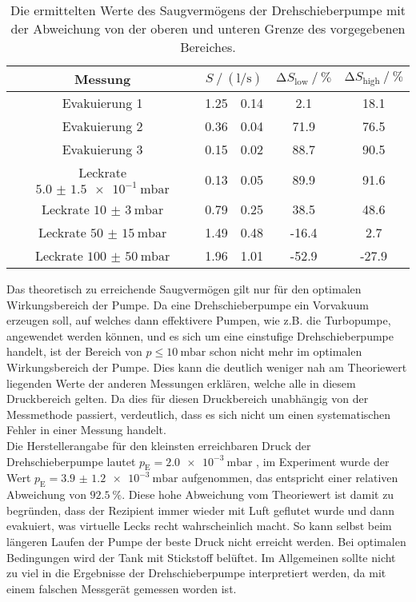 \begin{table}
    \centering
    \caption{Die ermittelten Werte des Saugvermögens der Drehschieberpumpe mit der Abweichung von der oberen und unteren Grenze des vorgegebenen Bereiches.}
    \label{tab:compare_dreh}
    \begin{tabular}{c  S @{${}\pm{}$} S  S[table-format=2.1] S[table-format=3.1]}
        \toprule
        {Messung} &  & {$\increment S_\text{low} \mathbin{/} \si{\percent}$} & {$\increment S_\text{high} \mathbin{/} \si{\percent}$} \\ 
        \midrule
        Evakuierung 1                       & 1.25 & 0.14 &  2.1 &  18.1\\
        Evakuierung 2                       & 0.36 & 0.04 & 71.9 &  76.5\\
        Evakuierung 3                       & 0.15 & 0.02 & 88.7 &  90.5\\
        Leckrate $\SI{5.0(15)e-1}{\milli\bar}$ & 0.13 & 0.05 & 89.9 &  91.6\\
        Leckrate $\SI{10(3)}{\milli\bar}$   & 0.79 & 0.25 & 38.5 &  48.6\\
        Leckrate $\SI{50(15)}{\milli\bar}$  & 1.49 & 0.48 &-16.4 &   2.7\\
        Leckrate $\SI{100(50)}{\milli\bar}$ & 1.96 & 1.01 &-52.9 & -27.9\\
        \bottomrule
    \end{tabular}
\end{table}

\noindent Das theoretisch zu erreichende Saugvermögen gilt nur für den optimalen Wirkungsbereich der Pumpe. Da eine Drehschieberpumpe ein Vorvakuum erzeugen soll, auf welches dann effektivere Pumpen, 
wie z.B. die Turbopumpe, angewendet werden können, und es sich um eine einstufige Drehschieberpumpe handelt, ist der Bereich von $p \leq \SI{10}{\milli\bar}$ schon nicht mehr im optimalen 
Wirkungsbereich der Pumpe. Dies kann die deutlich weniger nah am Theoriewert liegenden Werte der anderen Messungen erklären, welche alle in diesem Druckbereich gelten. 
Da dies für diesen Druckbereich unabhängig von der Messmethode passiert, verdeutlich, dass es sich nicht um einen systematischen Fehler in einer Messung handelt. \\ 
Die Herstellerangabe für den kleinsten erreichbaren Druck der Drehschieberpumpe lautet $p_\text{E} = \SI{2.0e-3}{\milli\bar}$ \cite{anleitung}, im Experiment wurde der Wert 
$p_\text{E} = \SI{3.9(12)e-3}{\milli\bar}$ aufgenommen, das entspricht einer relativen Abweichung von $\SI{92.5}{\percent}$. Diese hohe Abweichung vom Theoriewert ist damit zu begründen, 
dass der Rezipient immer wieder mit Luft geflutet wurde und dann evakuiert, was virtuelle Lecks recht wahrscheinlich macht. So kann selbst beim längeren Laufen der Pumpe der beste Druck 
nicht erreicht werden. Bei optimalen Bedingungen wird der Tank mit Stickstoff belüftet. Im Allgemeinen sollte nicht zu viel in die Ergebnisse der 
Drehschieberpumpe interpretiert werden, da mit einem falschen Messgerät gemessen worden ist. 

